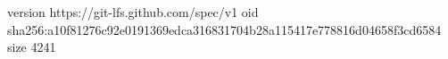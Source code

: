 version https://git-lfs.github.com/spec/v1
oid sha256:a10f81276c92e0191369edca316831704b28a115417e778816d04658f3cd6584
size 4241
